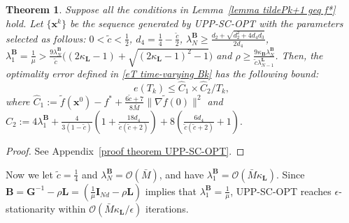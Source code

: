 \documentclass[12pt,draftcls,onecolumn]{IEEEtran}
\newcommand{\bx}{{\mathbf{x}}}
\newcommand{\bB}{{\mathbf{B}}}
\newcommand{\bG}{{\mathbf{G}}}
\newcommand{\bL}{{\mathbf{L}}}
\newtheorem{theorem}{Theorem}
\begin{document}
\begin{theorem}\label{theorem UPP-SC-OPT}
	Suppose all the conditions in Lemma~\ref{lemma tildePk+1 geq f*} hold. Let $\{\bx^k\}$ be the sequence generated by UPP-SC-OPT with the parameters selected as follows: $0<\tilde{c}<\frac{1}{2}$, $d_4= \frac{1}{4}- \frac{\tilde{c}}{2}$, $\lambda_N^{\mathbf{B}}\geq \frac{d_2+\sqrt{d_2^2+4d_4d_3}}{2d_4}$, $\lambda_1^{\mathbf{B}}=\frac{1}{\mu}>\frac{9\lambda_N^\bB}{\tilde{c}}\Big((2\kappa_\bL-1)+\sqrt{(2\kappa_\bL-1)^2-1}\Big)$ and $\rho \geq \frac{9\kappa_{\mathbf{B}}\lambda_N^{\mathbf{B}}}{\tilde{c}\lambda_{N-1}^{\mathbf{L}}}$. 
	Then, the optimality error defined in \eqref{eT time-varying Bk} has the following bound:
	\vspace{-0.2cm}
	\begin{equation}
		e(T_k) \leq \hat{C}_1\times {\hat{C}_2}/{T_k}, \label{epsilon leq C1C2/T}
	\end{equation}
	where $\hat{C}_1:= \tilde{f}(\mathbf{x}^0)-f^*+\frac{6\tilde{c}+7}{8\bar{M}}\|\nabla \tilde{f}(0)\|^2$ and $\hat{C}_2:= 4{\lambda}_1^{\mathbf{B}}+\frac{4}{3(1-\tilde{c})}(1+\frac{18d_4}{\tilde{c}(\tilde{c}+2)})+8(\frac{6d_4}{\tilde{c}(\tilde{c}+2)}+1).$
\end{theorem}

\begin{proof}
	See Appendix~\ref{proof theorem UPP-SC-OPT}.
\end{proof}

Now we let $\tilde{c}=\frac{1}{4}$ and $\lambda_N^\bB=\mathcal{O}(\bar{M})$, and have $\lambda_1^\bB=\mathcal{O}(\bar{M}\kappa_\bL)$. Since $\mathbf{B}=\bG^{-1}-\rho\bL=(\frac{1}{\mu}\mathbf{I}_{Nd}-\rho \mathbf{L})$ implies that $\lambda_1^\bB=\frac{1}{\mu}$, UPP-SC-OPT reaches $\epsilon$-stationarity within $\mathcal{O}(\bar{M}\kappa_\bL/\epsilon)$ iterations.
\end{document}
